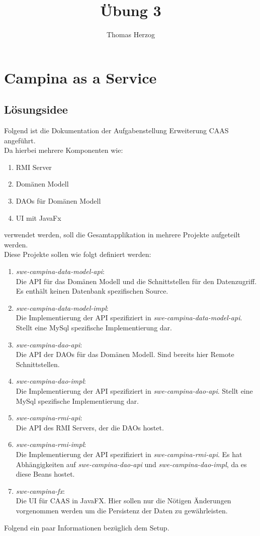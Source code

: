\documentclass[11pt, a4paper, twoside]{article}   	%
\title{Übung 3}
\author{Thomas Herzog}
\begin{document}
\setlength{\headheight}{15mm}

{\color{myred}
	\section
		{Campina as a Service}
}

\subsection{Lösungsidee}
Folgend ist die Dokumentation der Aufgabenstellung Erweiterung CAAS angeführt.\\
Da hierbei mehrere Komponenten wie:
\begin{enumerate}
	\item RMI Server
	\item Domänen Modell
	\item DAOs für Domänen Modell
	\item UI mit JavaFx
\end{enumerate}
verwendet werden, soll die Gesamtapplikation in mehrere Projekte aufgeteilt werden.\\
Diese Projekte sollen wie folgt definiert werden:
\begin{enumerate}
	\item \emph{swe-campina-data-model-api}:\\
	Die API für das Domänen Modell und die Schnittstellen für den Datenzugriff. Es enthält keinen Datenbank spezifischen Source.
	\item \emph{swe-campina-data-model-impl}:\\
	Die Implementierung der API spezifiziert in \emph{swe-campina-data-model-api}. Stellt eine MySql spezifische Implementierung dar.
	\item \emph{swe-campina-dao-api}:\\
	Die API der DAOs für das Domänen Modell. Sind bereits hier Remote Schnittstellen.
	\item \emph{swe-campina-dao-impl}:\\
	Die Implementierung der API spezifiziert in \emph{swe-campina-dao-api}. Stellt eine MySql spezifische Implementierung dar.
	\item \emph{swe-campina-rmi-api}:\\
	Die API des RMI Servers, der die DAOs hostet.
	\item \emph{swe-campina-rmi-impl}:\\
	Die Implementierung der API spezifiziert in \emph{swe-campina-rmi-api}. Es hat Abhängigkeiten auf \emph{swe-campina-dao-api} und \emph{swe-campina-dao-impl}, da es diese Beans hostet.
	\item \emph{swe-campina-fx}:\\
	Die UI für CAAS in JavaFX. Hier sollen nur die Nötigen Änderungen vorgenommen werden um die Persistenz der Daten zu gewährleisten. 
\end{enumerate}
Folgend ein paar Informationen bezüglich dem Setup.
\end{document}
